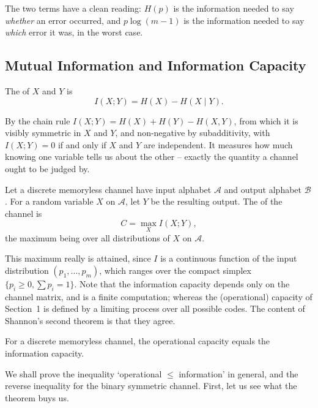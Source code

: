 \documentclass[a4paper]{scrartcl}
\newcommand{\Ac}{\mathcal{A}}
\newcommand{\Bc}{\mathcal{B}}
\begin{document}
The two terms have a clean reading: $H(p)$ is the information needed to say \emph{whether} an error occurred, and $p\log(m-1)$ is the information needed to say \emph{which} error it was, in the worst case.

\subsection{Mutual Information and Information Capacity}

\begin{definition}
	The  of $X$ and $Y$ is
	$$I(X;Y) = H(X)-H(X\mid Y).$$
\end{definition}

By the chain rule $I(X;Y) = H(X)+H(Y)-H(X,Y)$, from which it is visibly symmetric in $X$ and $Y$, and non-negative by subadditivity, with $I(X;Y)=0$ if and only if $X$ and $Y$ are independent. It measures how much knowing one variable tells us about the other -- exactly the quantity a channel ought to be judged by.

\begin{definition}
	Let a discrete memoryless channel have input alphabet $\Ac$ and output alphabet $\Bc$. For a random variable $X$ on $\Ac$, let $Y$ be the resulting output. The  of the channel is
	$$C = \max_X I(X;Y),$$
	the maximum being over all distributions of $X$ on $\Ac$.
\end{definition}

This maximum really is attained, since $I$ is a continuous function of the input distribution $(p_1,\dots,p_m)$, which ranges over the compact simplex $\{p_i \ge 0, \sum p_i = 1\}$. Note that the information capacity depends only on the channel matrix, and is a finite computation; whereas the (operational) capacity of Section~1 is defined by a limiting process over all possible codes. The content of Shannon's second theorem is that they agree.

\begin{theorem}\label{thm:secondcoding}
	For a discrete memoryless channel, the operational capacity equals the information capacity.
\end{theorem}

We shall prove the inequality `operational $\le$ information' in general, and the reverse inequality for the binary symmetric channel. First, let us see what the theorem buys us.
\end{document}
